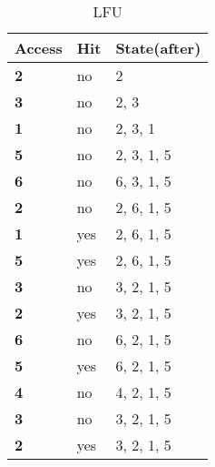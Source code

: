\documentclass{article}
\begin{document}
\begin{latin}
\begin{table}[H]
\caption{LFU}
\label{tab:my-table}
\begin{tabular}{|l|l|l|}
\hline
\textbf{Access} & \textbf{Hit} & \textbf{State(after)} \\ \hline
\textbf{2}      & no           & 2                     \\ \hline
\textbf{3}      & no           & 2, 3                  \\ \hline
\textbf{1}      & no           & 2, 3, 1               \\ \hline
\textbf{5}      & no           & 2, 3, 1, 5            \\ \hline
\textbf{6}      & no           & 6, 3, 1, 5            \\ \hline
\textbf{2}      & no           & 2, 6, 1, 5            \\ \hline
\textbf{1}      & yes          & 2, 6, 1, 5            \\ \hline
\textbf{5}      & yes          & 2, 6, 1, 5            \\ \hline
\textbf{3}      & no           & 3, 2, 1, 5            \\ \hline
\textbf{2}      & yes          & 3, 2, 1, 5            \\ \hline
\textbf{6}      & no           & 6, 2, 1, 5            \\ \hline
\textbf{5}      & yes          & 6, 2, 1, 5            \\ \hline
\textbf{4}      & no           & 4, 2, 1, 5            \\ \hline
\textbf{3}      & no           & 3, 2, 1, 5            \\ \hline
\textbf{2}      & yes          & 3, 2, 1, 5            \\ \hline
\end{tabular}
\end{table}
\end{latin}
\end{document}

